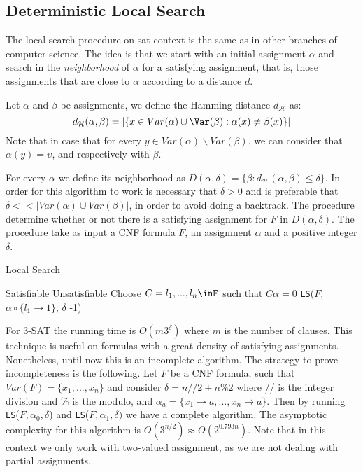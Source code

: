 \subsection{Deterministic Local Search}

The local search procedure on sat context is the same as in other branches of computer science. The idea is that we start with an initial assignment $\alpha$ and search in the \emph{neighborhood} of $\alpha$ for a satisfying assignment, that is, those assignments that are close to $\alpha$ according to a distance $d$. 

\begin{definition}
  Let $\alpha$ and $\beta$ be assignments, we define the Hamming distance $d_\mathcal{H}$ as:
  $$d_\mathcal{H}(\alpha,\beta) =  |\{ x \in Var(\alpha) \cup \Var(\beta) : \alpha(x) \ne \beta(x) \} |$$
  Note that in case that for every $y \in Var(\alpha) \backslash Var(\beta)$, we can  consider that $\alpha(y) = \upsilon$, and respectively with $\beta$.
\end{definition}

For every $\alpha$ we define its neighborhood as $D(\alpha,\delta) = \{\beta : d_\mathcal{H}(\alpha,\beta) \le \delta\}$. In order for this algorithm to work is necessary that $\delta > 0$ and is preferable that $\delta << |Var(\alpha) \cup Var(\beta)|$, in order to avoid doing a backtrack. The procedure determine whether or not there is a satisfying assignment for $F$ in $D(\alpha,\delta)$. The procedure take as input a CNF formula $F$, an assignment $\alpha$ and a positive integer $\delta$.

\begin{algorithm}
  \caption{Local Search\cite{schoning2013satisfiability}}\label{ds}
  \begin{algorithmic}[1]
     \Return Satisfiable
    \EndIf
     \Return Unsatisfiable 
    \EndIf
    \State Choose $C={l_1,...,l_n}\inF$ such that $C\alpha=0$
  \State \Return \texttt{LS}($F$, $\alpha\circ\{l_1 \to 1\}$, $\delta$ -1)
  \EndFor
\end{algorithmic}
\end{algorithm}


For 3-SAT the running time is $O(m3^\delta)$ where $m$ is the number of clauses. This technique is useful on formulas with a great density of satisfying assignments. Nonetheless, until now this is an incomplete algorithm. The strategy to prove incompleteness is the following. Let $F$ be a CNF formula, such that $Var(F)=\{x_1,...,x_n\}$ and consider $\delta = n//2+n\%2$ where // is the integer division and \% is the modulo, and $\alpha_a = \{x_1 \to a,...,x_n\to a\}$. Then by running \texttt{LS}($F,\alpha_0,\delta$) and \texttt{LS}($F,\alpha_1,\delta)$ we have a complete algorithm. The asymptotic complexity for this algorithm is $O(3^{n/2}) \approx O(2^{0.793n})$. Note that in this context we only work with two-valued assignment, as we are not dealing with partial assignments.\\

